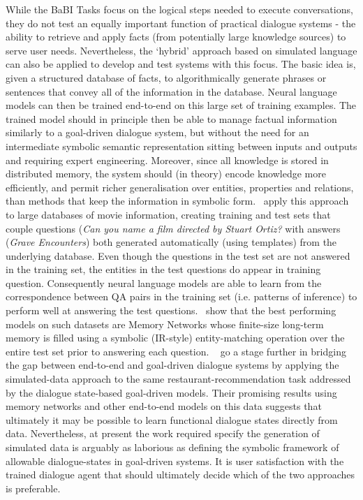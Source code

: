\documentclass[11pt,letterpaper]{article}
\begin{document}
While the BaBI Tasks focus on the logical steps needed to execute conversations, they do not test an equally important function of practical dialogue systems - the ability to retrieve and apply facts (from potentially large knowledge sources) to serve user needs. Nevertheless, the `hybrid' approach based on simulated language can also be applied to develop and test systems with this focus. The basic idea is, given a structured database of facts, to algorithmically generate phrases or sentences that convey all of the information in the database. Neural language models can then be trained end-to-end on this large set of training examples. The trained model should in principle then be able to manage factual information similarly to a goal-driven dialogue system, but without the need for an intermediate symbolic semantic representation sitting between inputs and outputs and requiring expert engineering. Moreover, since all knowledge is stored in distributed memory, the system should (in theory) encode knowledge more efficiently, and permit richer generalisation over entities, properties and relations, than methods that keep the information in symbolic form.~\cite{dodge2015evaluating} apply this approach to large databases of movie information, creating training and test sets that couple questions (\emph{Can you name a film directed by Stuart Ortiz?} with answers (\emph{Grave Encounters}) both generated automatically (using templates) from the underlying database. Even though the questions in the test set are not answered in the training set, the entities in the test questions do appear in training question. Consequently neural language models are able to learn from the correspondence between QA pairs in the training set (i.e. patterns of inference) to perform well at answering the test questions.~\cite{dodge2015evaluating} show that the best performing models on such datasets are Memory Networks whose finite-size long-term memory is filled using a symbolic (IR-style) entity-matching operation over the entire test set prior to answering each question. ~\cite{bordes2016learning} go a stage further in bridging the gap between end-to-end and goal-driven dialogue systems by applying the simulated-data approach to the same restaurant-recommendation task addressed by the dialogue state-based goal-driven models. Their promising results using memory networks and other end-to-end models on this data suggests that ultimately it may be possible to learn functional dialogue states directly from data. Nevertheless, at present the work required specify the generation of simulated data is arguably as laborious as defining the symbolic framework of allowable dialogue-states in goal-driven systems. It is user satisfaction with the trained dialogue agent that should ultimately decide which of the two approaches is preferable.
\end{document}
